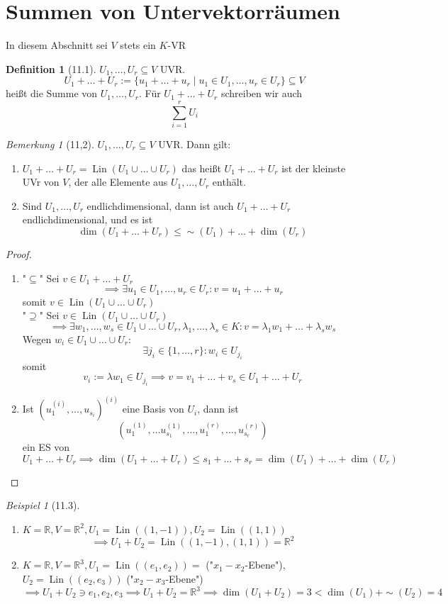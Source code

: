 \documentclass[a4paper]{scrartcl}
\DeclareMathOperator{\Exists}{\exists}
\DeclareMathOperator{\Lin}{Lin}
\theoremstyle{definition}
\newtheorem{defn}{Definition}
\theoremstyle{plain}
\theoremstyle{plain}
\theoremstyle{remark}
\newtheorem{remark}{Bemerkung}
\theoremstyle{remark}
\theoremstyle{remark}
\theoremstyle{remark}
\theoremstyle{remark}
\newtheorem{ex}{Beispiel}
\begin{document}
\section{Summen von Untervektorräumen}
\label{sec-8}
In diesem Abschnitt sei $V$ stets ein $K$-VR
\begin{defn}[11.1]
$U_1, \ldots, U_r \subseteq V$ UVR.
\[U_1 + \ldots + U_r := \{u_1 + \ldots + u_r \mid u_1 \in U_1, \ldots, u_r \in U_r\} \subseteq V\]
heißt die Summe von $U_1, \ldots, U_r$. Für $U_1 + \ldots + U_r$ schreiben wir auch
\[\sum_{i = 1}^{r} U_i\]
\end{defn}
\begin{remark}[11,2]
$U_1, \ldots, U_r \subseteq V$ UVR. Dann gilt:
\begin{enumerate}
\item $U_1 + \ldots + U_r = \Lin(U_1 \cup \ldots \cup U_r)$ das heißt $U_1 + \ldots + U_r$
         ist der kleinste UVr von $V$, der alle Elemente aus $U_1, \ldots, U_r$ enthält.
\item Sind $U_1, \ldots, U_r$ endlichdimensional, dann ist auch $U_1 + \ldots + U_r$
endlichdimensional, und es ist
\[\dim(U_1 + \ldots + U_r) \leq \sim(U_1) + \ldots + \dim(U_r)\]
\end{enumerate}
\end{remark}
\begin{proof}
\begin{enumerate}
\item "$\subseteq$" Sei $v\in U_1 + \ldots + U_r$
         \[\implies \Exists u_1 \in U_1, \ldots, u_r \in U_r: v = u_1 + \ldots + u_r\]
         somit $v \in \Lin(U_1 \cup\ldots \cup U_r)$ \\
         "$\supseteq$" Sei $v\in \Lin(U_1 \cup \ldots \cup U_r)$
         \[\implies \Exists w_1, \ldots, w_s \in U_1 \cup \ldots \cup U_r, \lambda_1, \ldots, \lambda_s \in K: v = \lambda_1 w_1 + \ldots + \lambda_s w_s\]
         Wegen $w_i \in U_1 \cup \ldots \cup U_r$: \[\Exists j_i \in \{1, \ldots, r\}: w_i \in U_{j_i}\]
         somit \[v_i := \lambda w_1 \in U_{j_i} \implies v = v_1 + \ldots + v_s \in U_1 + \ldots + U_r\]
\item Ist $(u_1^{(i)}, \ldots, u_{s_i})^{(i)}$ eine Basis von $U_i$, dann ist
\[(u_1^{(1)}, \ldots u_{s_1}^{(1)}, \ldots, u_{1}^{(r)}, \ldots, u_{s_r}^{(r)})\]
ein ES von $U_1 + \ldots + U_r \implies \dim(U_1 + \ldots + U_r) \leq s_1 + \ldots + s_r = \dim(U_1) + \ldots + \dim(U_r)$
\end{enumerate}
\end{proof}
\begin{ex}[11.3]
\begin{enumerate}
\item $K = \mathbb{R}, V = \mathbb{R}^2, U_1 = \Lin((1,-1)), U_2 = \Lin((1, 1))$ \\
         \[\implies U_1 + U_2 = \Lin((1, -1), (1, 1)) = \mathbb{R}^2\]
\item $K = \mathbb{R}, V = \mathbb{R}^3, U_1 = \Lin((e_1, e_2)) =$ ("$x_1-x_2$-Ebene"), $U_2 = \Lin((e_2, e_3))$ ("$x_2 - x_3$-Ebene")
\[\implies U_1 + U_2 \ni e_1, e_2, e_3 \implies U_1 + U_2 = \mathbb{R}^3 \implies \dim(U_1 + U_2) = 3 < \dim(U_1) + \sim(U_2) = 4\]
\end{enumerate}
\end{ex}
\end{document}
